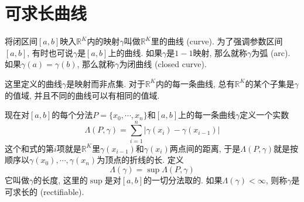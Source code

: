 \documentclass[cn,12pt,math=mtpro2,citestyle=gb7714-2015,bibstyle=gb7714-2015,twocol]{elegantbook}
\newcommand{\R}{\mathbb{R}}
\begin{document}
\section{可求长曲线}
\begin{definition}
将闭区间$[a,b]$映入$\R^K$内的映射$\gamma$叫做$\R^K$里的曲线 (curve). 为了强调参数区间$[a,b]$, 有时也可说$\gamma$是$[a,b]$上的曲线. 如果$\gamma$是$1-1$映射, 那么就称$\gamma$为弧 (arc). 如果$\gamma(a)=\gamma(b)$, 那么就称$\gamma$为闭曲线 (closed curve).
\end{definition}
\begin{remark}
这里定义的曲线$\gamma$是映射而非点集. 对于$\R^K$内的每一条曲线, 总有$\R^K$的某个子集是$\gamma$的值域, 并且不同的曲线可以有相同的值域.
\end{remark}
现在对$[a,b]$的每个分法$P=\{x_0,\cdots,x_n\}$和$[a,b]$上的每一条曲线$\gamma$定义一个实数
$$\Lambda(P,\gamma)=\sum_{i=1}^{n}|\gamma(x_i)-\gamma(x_{i-1})|$$
这个和式的第$i$项就是$\R^K$里$\gamma(x_{i-1})$和$\gamma(x_i)$两点间的距离, 于是$\Lambda(P,\gamma)$就是按顺序以$\gamma(x_0),\cdots,\gamma(x_n)$为顶点的折线的长. 定义
$$\Lambda(\gamma)=\sup \Lambda(P,\gamma)$$
它叫做$\gamma$的长度, 这里的$\sup$是对$[a,b]$的一切分法取的. 如果$\Lambda(\gamma)<\infty$, 则称$\gamma$是可求长的 (rectifiable).
\end{document}
